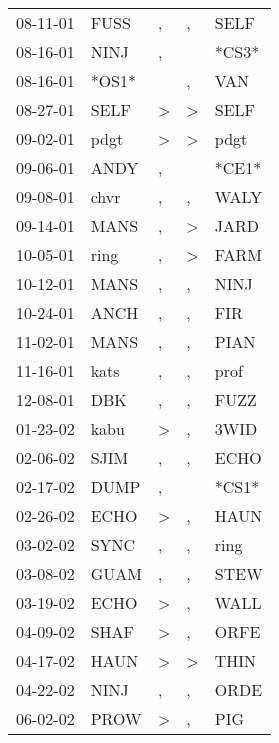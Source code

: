 \begin{supertabular}{lllll}
 08-11-01 &   FUSS &             , &             , &   SELF \\
 08-16-01 &   NINJ &             , &               &  *CS3* \\
 08-16-01 &  *OS1* &               &             , &    VAN \\
 08-27-01 &   SELF &  \textgreater &  \textgreater &   SELF \\
 09-02-01 &   pdgt &  \textgreater &  \textgreater &   pdgt \\
 09-06-01 &   ANDY &             , &               &  *CE1* \\
 09-08-01 &   chvr &             , &             , &   WALY \\
 09-14-01 &   MANS &             , &  \textgreater &   JARD \\
 10-05-01 &   ring &             , &  \textgreater &   FARM \\
 10-12-01 &   MANS &             , &             , &   NINJ \\
 10-24-01 &   ANCH &             , &             , &    FIR \\
 11-02-01 &   MANS &             , &             , &   PIAN \\
 11-16-01 &   kats &             , &             , &   prof \\
 12-08-01 &    DBK &             , &             , &   FUZZ \\
 01-23-02 &   kabu &  \textgreater &             , &   3WID \\
 02-06-02 &   SJIM &             , &             , &   ECHO \\
 02-17-02 &   DUMP &             , &               &  *CS1* \\
 02-26-02 &   ECHO &  \textgreater &             , &   HAUN \\
 03-02-02 &   SYNC &             , &             , &   ring \\
 03-08-02 &   GUAM &             , &             , &   STEW \\
 03-19-02 &   ECHO &  \textgreater &             , &   WALL \\
 04-09-02 &   SHAF &  \textgreater &             , &   ORFE \\
 04-17-02 &   HAUN &  \textgreater &  \textgreater &   THIN \\
 04-22-02 &   NINJ &             , &             , &   ORDE \\
 06-02-02 &   PROW &  \textgreater &             , &    PIG \\

\end{supertabular}
